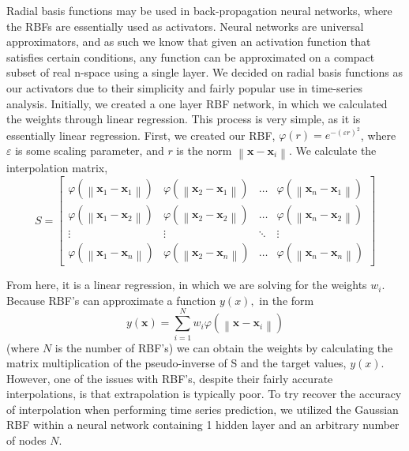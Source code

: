 \documentclass[12pt]{article}
\begin{document}
    Radial basis functions may be used in back-propagation neural networks, where the RBFs are essentially used as activators. Neural networks are universal approximators, and as such we know that given an activation function that satisfies certain conditions, any function can be approximated on a compact subset of real n-space using a single layer. We decided on radial basis functions as our activators due to their simplicity and fairly popular use in time-series analysis. Initially, we created a one layer RBF network, in which we calculated the weights through linear regression. This process is very simple, as it is essentially linear regression. First, we created our RBF, $\varphi(r)=e^{-(\varepsilon r)^{2}}$, where $\varepsilon$ is some scaling parameter, and $r$ is the norm  $\left\|\mathbf{x}-\mathbf{x}_{i}\right\|$. We calculate the interpolation matrix, 
$$S=
 \left[ \begin{array}{cccc}{\varphi\left(\left\|\mathbf{x}_{1}-\mathbf{x}_{1}\right\|\right)} & {\varphi\left(\left\|\mathbf{x}_{2}-\mathbf{x}_{1}\right\|\right)} & {\dots} & {\varphi\left(\left\|\mathbf{x}_{n}-\mathbf{x}_{1}\right\|\right)} \\ {\varphi\left(\left\|\mathbf{x}_{1}-\mathbf{x}_{2}\right\|\right)} & {\varphi\left(\left\|\mathbf{x}_{2}-\mathbf{x}_{2}\right\|\right)} & {\dots} & {\varphi\left(\left\|\mathbf{x}_{n}-\mathbf{x}_{2}\right\|\right)} \\ {\vdots} & {\vdots} & {\ddots} & {\vdots} \\ {\varphi\left(\left\|\mathbf{x}_{1}-\mathbf{x}_{n}\right\|\right)} & {\varphi\left(\left\|\mathbf{x}_{2}-\mathbf{x}_{n}\right\|\right)} & {\dots} & {\varphi\left(\left\|\mathbf{x}_{n}-\mathbf{x}_{n}\right\|\right)}\end{array}\right]$$

From here, it is a linear regression, in which we are solving for the weights $w_i$. Because RBF’s can approximate a function $y(x),$ in the form  $$y(\mathbf{x})=\sum_{i=1}^{N} w_{i} \varphi\left(\left\|\mathbf{x}-\mathbf{x}_{i}\right\|\right)$$ (where $N$ is the number of RBF’s) we can obtain the weights by calculating the matrix multiplication of the pseudo-inverse of S and the target values, $y(x).$ However, one of the issues with RBF’s, despite their fairly accurate interpolations, is that extrapolation is typically poor. 
    To try recover the accuracy of interpolation when performing time series prediction, we utilized the Gaussian RBF within a neural network containing 1 hidden layer and an arbitrary number of nodes $N$.
\end{document}
